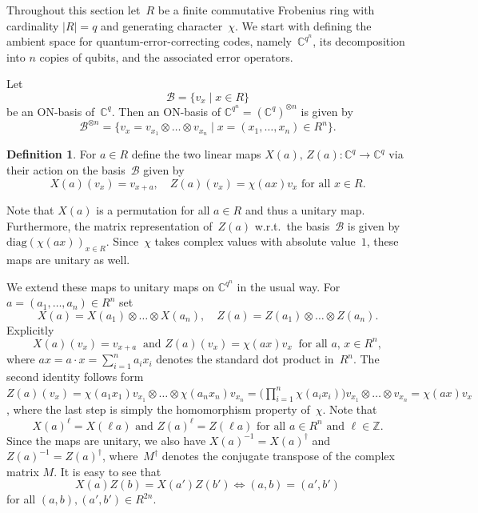 \documentclass[11pt]{article}
\theoremstyle{definition}
\newtheorem{defi}[theo]{Definition}
\numberwithin{equation}{section}
\newcommand{\Z}{{\mathbb Z}}
\newcommand{\C}{{\mathbb C}}
\newcommand{\cB}{{\mathcal B}}
\newcommand{\cBn}{\mbox{$\cB^{\otimes n}$}}
\newcounter{ara}
\begin{document}
Throughout this section let~$R$ be a finite commutative Frobenius ring with cardinality $|R|=q$ and generating character~$\chi$.
We start with defining the ambient space for quantum-error-correcting codes, namely~$\C^{q^n}$, its decomposition into $n$ copies of qubits, and the associated
error operators.

Let
\[
  \cB=\{v_x\mid x\in R\}
\]
be an ON-basis of~$\C^q$.
Then an ON-basis of $\C^{q^n}=(\C^q)^{\otimes n}$ is given by
\begin{equation}\label{e-Bn}
  \cBn=\{v_x=v_{x_1}\otimes\ldots\otimes v_{x_n}\mid x=(x_1,\ldots,x_n)\in R^n\}.
\end{equation}

\begin{defi}\label{D-XZa}
For $a\in R$ define the two linear maps $X(a),\,Z(a):\C^{q}\longrightarrow\C^{q}$ via their action on the
basis~$\cB$ given by
\[
  X(a)(v_x)=v_{x+a},\quad Z(a)(v_x)=\chi(ax)v_x \text{ for all }x\in R.
\]
\end{defi}


Note that $X(a)$ is a permutation for all $a\in R$ and thus a unitary map.
Furthermore, the matrix representation of~$Z(a)$ w.r.t.~the basis~$\cB$ is given by $\text{diag}(\chi(ax))_{x\in R}$.
Since~$\chi$ takes complex values with absolute value~$1$, these maps are unitary as well.

We extend these maps to unitary maps on $\C^{q^n}$ in the usual way.
For $a=(a_1,\ldots,a_n)\in R^n$ set
\[
  X(a)=X(a_1)\otimes\ldots\otimes X(a_n),\quad Z(a)=Z(a_1)\otimes\ldots\otimes Z(a_n).
\]
Explicitly
\begin{equation}\label{e-XZ}
  X(a)(v_x)=v_{x+a}\ \text{ and }
  Z(a)(v_x)=\chi(a x)v_x \ \text{ for all }a,\,x\in R^n,
\end{equation}
where $ax=a\cdot x=\sum_{i=1}^n a_i x_i$ denotes the standard dot product in~$R^n$.
The second identity follows form
$Z(a)(v_x)=\chi(a_1x_1)v_{x_1}\otimes\ldots\otimes\chi(a_nx_n)v_{x_n}
=\big(\prod_{i=1}^n\chi(a_ix_i)\big)v_{x_1}\otimes\ldots\otimes v_{x_n}=\chi(a x)v_x$, where the last step is simply the
homomorphism property of~$\chi$.
Note that
\[
   X(a)^\ell=X(\ell a)\text{ and }Z(a)^\ell=Z(\ell a)\text{ for all }a\in R^n\text{ and }\ell\in\Z.
\]
Since the maps are unitary, we also have $X(a)^{-1}=X(a)^\dagger$ and $Z(a)^{-1}=Z(a)^\dagger$,
where~$M^\dagger$ denotes the conjugate transpose of the complex matrix $M$.
It is easy to see that
\begin{equation}\label{e-ab0}
  X(a)Z(b)=X(a')Z(b')\Longleftrightarrow (a,b)=(a',b')
\end{equation}
for all $(a,b),(a',b')\in R^{2n}$.
\end{document}
